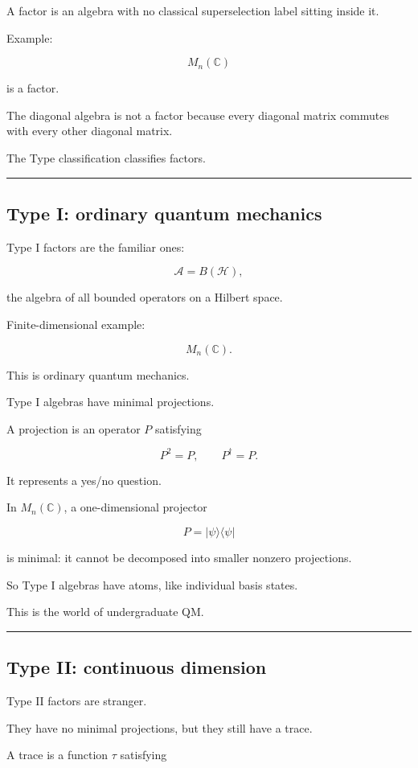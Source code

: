 \documentclass[11pt,a4paper]{article}
\begin{document}
A factor is an algebra with no classical superselection label sitting inside it.

Example:

\[
M_n(\mathbb{C})
\]

is a factor.

The diagonal algebra is not a factor because every diagonal matrix commutes with every other diagonal matrix.

The Type classification classifies factors.

\medskip\hrule\medskip

\subsection{Type I: ordinary quantum mechanics}

Type I factors are the familiar ones:

\[
\mathcal{A}=B(\mathcal{H}),
\]

the algebra of all bounded operators on a Hilbert space.

Finite-dimensional example:

\[
M_n(\mathbb{C}).
\]

This is ordinary quantum mechanics.

Type I algebras have minimal projections.

A projection is an operator $P$ satisfying

\[
P^2=P,\qquad P^\dagger=P.
\]

It represents a yes/no question.

In $M_n(\mathbb{C})$, a one-dimensional projector

\[
P=|\psi\rangle\langle\psi|
\]

is minimal: it cannot be decomposed into smaller nonzero projections.

So Type I algebras have atoms, like individual basis states.

This is the world of undergraduate QM.

\medskip\hrule\medskip

\subsection{Type II: continuous dimension}

Type II factors are stranger.

They have no minimal projections, but they still have a trace.

A trace is a function $\tau$ satisfying
\end{document}
